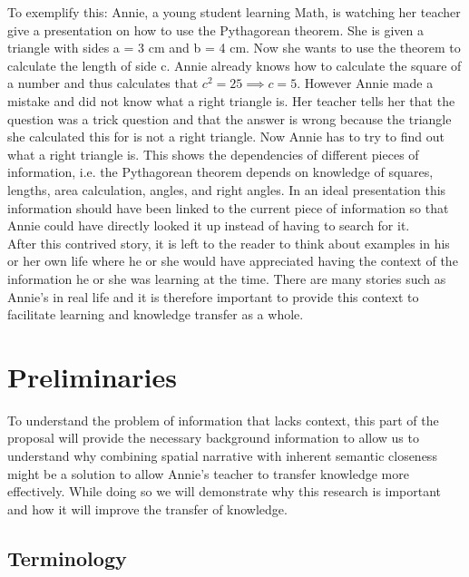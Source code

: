 \documentclass[twoside]{article}
\begin{document}
To exemplify this: Annie, a young student learning Math, is watching her teacher give a presentation on how to use the Pythagorean theorem. She is given a triangle with sides a = 3 cm and b = 4 cm. Now she wants to use the theorem to calculate the length of side c. Annie already knows how to calculate the square of a number and thus calculates that $c^2 = 25 \implies c = 5$. However Annie made a mistake and did not know what a right triangle is. Her teacher tells her that the question was a trick question and that the answer is wrong because the triangle she calculated this for is not a right triangle. Now Annie has to try to find out what a right triangle is. This shows the dependencies of different pieces of information, i.e. the Pythagorean theorem depends on knowledge of squares, lengths, area calculation, angles, and right angles. In an ideal presentation this information should have been linked to the current piece of information so that Annie could have directly looked it up instead of having to search for it.\\

After this contrived story, it is left to the reader to think about examples in his or her own life where he or she would have appreciated having the context of the information he or she was learning at the time. There are many stories such as Annie's in real life and it is therefore important to provide this context to facilitate learning and knowledge transfer as a whole. \\

\newpage
\section{Preliminaries}
\label{sec:preliminaries}

To understand the problem of information that lacks context, this part of the proposal will provide the necessary background information to allow us to understand why combining spatial narrative with inherent semantic closeness might be a solution to allow Annie's teacher to transfer knowledge more effectively. While doing so we will demonstrate why this research is important and how it will improve the transfer of knowledge.\\

\subsection{Terminology}
\label{sec:terminology}
\end{document}
